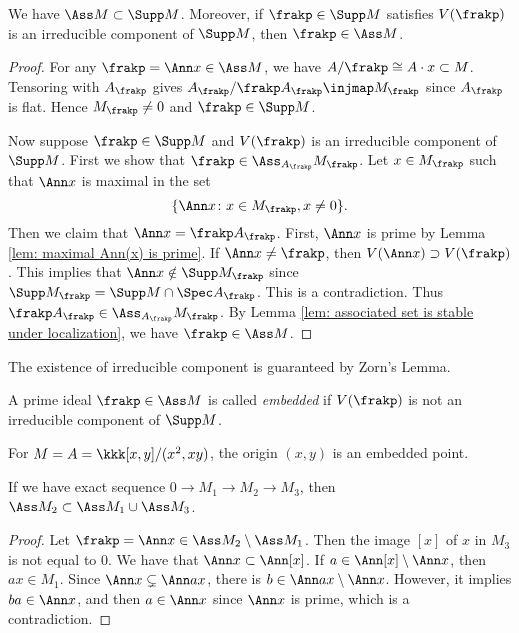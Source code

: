     \begin{proposition}\label{prop: Ass is subset of Supp}
        We have $\Ass M \subset \Supp M$.
        Moreover, if $\frakp \in \Supp M$ satisfies $V(\frakp)$ is an irreducible component of $\Supp M$, then $\frakp \in \Ass M$.
    \end{proposition}
    \begin{proof}
        For any $\frakp = \Ann x \in \Ass M$, we have $A/\frakp \cong A \cdot x \subset M$.
        Tensoring with $A_\frakp$ gives $A_\frakp/\frakp A_\frakp \injmap M_\frakp$ since $A_\frakp$ is flat.
        Hence $M_\frakp \neq 0$ and $\frakp \in \Supp M$.

        Now suppose $\frakp \in \Supp M$ and $V(\frakp)$ is an irreducible component of $\Supp M$.
        First we show that $\frakp \in \Ass_{A_\frakp} M_\frakp$.
        Let $x \in M_\frakp$ such that $\Ann x$ is maximal in the set 
        \[ \{ \Ann x \colon x \in M_\frakp, x \neq 0 \}. \]
        Then we claim that $\Ann x = \frakp A_\frakp$.
        First, $\Ann x$ is prime by Lemma \ref{lem: maximal Ann(x) is prime}.
        If $\Ann x \neq \frakp$, then $V(\Ann x) \supset V(\frakp)$.
        This implies that $\Ann x \notin \Supp M_\frakp$ since $\Supp M_\frakp = \Supp M \cap \Spec A_\frakp$.
        This is a contradiction.
        Thus $\frakp A_\frakp \in \Ass_{A_\frakp} M_\frakp$.
        By Lemma \ref{lem: associated set is stable under localization}, we have $\frakp \in \Ass M$. 
    \end{proof}

    \begin{remark}
        The existence of irreducible component is guaranteed by Zorn's Lemma.
    \end{remark}

    \begin{definition}\label{def: embedded prime}
        A prime ideal $\frakp \in \Ass M$ is called \textit{embedded} if $V(\frakp)$ is not an irreducible component of $\Supp M$.
    \end{definition}

    \begin{example}
        For $M = A = \kkk[x,y]/(x^2,xy)$, the origin $(x,y)$ is an embedded point.
    \end{example}

    \begin{proposition}\label{prop: Aass under exact sequence}
        If we have exact sequence $0 \to M_1 \to M_2 \to M_3$, then $\Ass M_2 \subset \Ass M_1 \cup \Ass M_3$.
    \end{proposition}
    \begin{proof}
        Let $\frakp = \Ann x \in \Ass M_2 \setminus \Ass M_1$.
        Then the image $[x]$ of $x$ in $M_3$ is not equal to $0$.
        We have that $\Ann x \subset \Ann [x]$.
        If $a \in \Ann [x] \setminus \Ann x$, then $ax \in M_1$.
        Since $\Ann x \subsetneq \Ann ax$, there is $b \in \Ann ax \setminus \Ann x$.
        However, it implies $ba \in \Ann x$, and then $a \in \Ann x$ since $\Ann x$ is prime, which is a contradiction.
    \end{proof}

